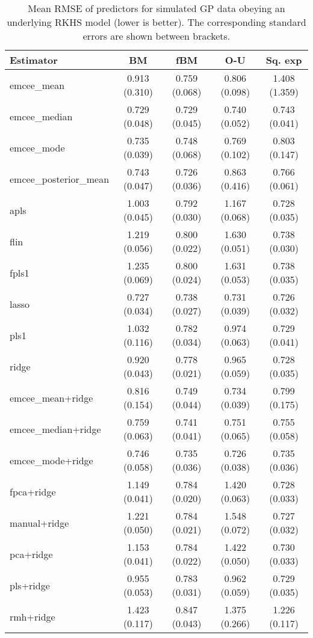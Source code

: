 \begin{table}[htbp!]
  \centering
  \begin{tabular}{lcccc}
\toprule
            \textbf{Estimator} &            \textbf{BM} &           \textbf{fBM} &           \textbf{O-U} &        \textbf{Sq. exp} \\
\midrule
          emcee\_mean & 0.913 (0.310) & 0.759 (0.068) & 0.806 (0.098) & 1.408 (1.359) \\
        emcee\_median & 0.729 (0.048) & 0.729 (0.045) & 0.740 (0.052) & 0.743 (0.041) \\
          emcee\_mode & 0.735 (0.039) & 0.748 (0.068) & 0.769 (0.102) & 0.803 (0.147) \\
emcee\_posterior\_mean & 0.743 (0.047) & 0.726 (0.036) & 0.863 (0.416) & 0.766 (0.061) \\
                apls & 1.003 (0.045) & 0.792 (0.030) & 1.167 (0.068) & 0.728 (0.035) \\
                flin & 1.219 (0.056) & 0.800 (0.022) & 1.630 (0.051) & 0.738 (0.030) \\
               fpls1 & 1.235 (0.069) & 0.800 (0.024) & 1.631 (0.053) & 0.738 (0.035) \\
               lasso & 0.727 (0.034) & 0.738 (0.027) & 0.731 (0.039) & 0.726 (0.032) \\
                pls1 & 1.032 (0.116) & 0.782 (0.034) & 0.974 (0.063) & 0.729 (0.041) \\
               ridge & 0.920 (0.043) & 0.778 (0.021) & 0.965 (0.059) & 0.728 (0.035) \\

\bottomrule
\toprule

emcee\_mean+ridge & 0.816 (0.154) & 0.749 (0.044) & 0.734 (0.039) & 0.799 (0.175) \\
emcee\_median+ridge & 0.759 (0.063) & 0.741 (0.041) & 0.751 (0.065) & 0.755 (0.058) \\
  emcee\_mode+ridge & 0.746 (0.058) & 0.735 (0.036) & 0.726 (0.038) & 0.735 (0.036) \\
        fpca+ridge & 1.149 (0.041) & 0.784 (0.020) & 1.420 (0.063) & 0.728 (0.033) \\
      manual+ridge & 1.221 (0.050) & 0.784 (0.021) & 1.548 (0.072) & 0.727 (0.032) \\
         pca+ridge & 1.153 (0.041) & 0.784 (0.022) & 1.422 (0.050) & 0.730 (0.033) \\
         pls+ridge & 0.955 (0.053) & 0.783 (0.031) & 0.962 (0.059) & 0.729 (0.035) \\
         rmh+ridge & 1.423 (0.117) & 0.847 (0.043) & 1.375 (0.266) & 1.226 (0.117) \\

\bottomrule
\end{tabular}
  \caption{Mean RMSE of predictors for simulated GP data obeying an underlying RKHS model (lower is better). The corresponding standard errors are shown between brackets.}
\end{table}

